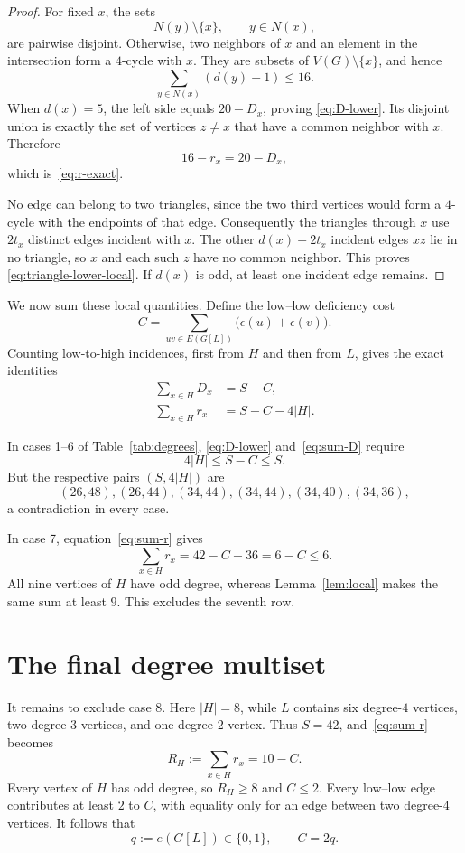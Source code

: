 \documentclass[11pt]{article}
\begin{document}
\begin{proof}
For fixed $x$, the sets
\[
 N(y)\setminus\{x\},\qquad y\in N(x),
\]
are pairwise disjoint.  Otherwise, two neighbors of $x$ and an element in
the intersection form a $4$-cycle with $x$.  They are subsets of
$V(G)\setminus\{x\}$, and hence
\begin{equation}\label{eq:local-packing}
 \sum_{y\in N(x)}(d(y)-1)\leq16.
\end{equation}
When $d(x)=5$, the left side equals $20-D_x$, proving
\eqref{eq:D-lower}.  Its disjoint union is exactly the set of vertices
$z\ne x$ that have a common neighbor with $x$.  Therefore
\[
 16-r_x=20-D_x,
\]
which is~\eqref{eq:r-exact}.

No edge can belong to two triangles, since the two third vertices would
form a $4$-cycle with the endpoints of that edge.  Consequently the
triangles through $x$ use $2t_x$ distinct edges incident with $x$.  The
other $d(x)-2t_x$ incident edges $xz$ lie in no triangle, so $x$ and each
such $z$ have no common neighbor.  This proves
\eqref{eq:triangle-lower-local}.  If $d(x)$ is odd, at least one incident
edge remains.
\end{proof}

We now sum these local quantities.  Define the low--low deficiency cost
\[
 C=\sum_{uv\in E(G[L])}\bigl(\epsilon(u)+\epsilon(v)\bigr).
\]
Counting low-to-high incidences, first from $H$ and then from $L$, gives the
exact identities
\begin{align}
 \sum_{x\in H}D_x&=S-C,\label{eq:sum-D}\\
 \sum_{x\in H}r_x&=S-C-4|H|.\label{eq:sum-r}
\end{align}

In cases 1--6 of Table~\ref{tab:degrees},
\eqref{eq:D-lower} and~\eqref{eq:sum-D} require
\[
 4|H|\leq S-C\leq S.
\]
But the respective pairs $(S,4|H|)$ are
\[
 (26,48),(26,44),(34,44),(34,44),(34,40),(34,36),
\]
a contradiction in every case.

In case 7, equation~\eqref{eq:sum-r} gives
\[
 \sum_{x\in H}r_x=42-C-36=6-C\leq6.
\]
All nine vertices of $H$ have odd degree, whereas
Lemma~\ref{lem:local} makes the same sum at least $9$.  This excludes the
seventh row.

\section{The final degree multiset}

It remains to exclude case 8.  Here $|H|=8$, while $L$ contains six
degree-$4$ vertices, two degree-$3$ vertices, and one degree-$2$ vertex.
Thus $S=42$, and~\eqref{eq:sum-r} becomes
\begin{equation}\label{eq:RH}
 R_H:=\sum_{x\in H}r_x=10-C.
\end{equation}
Every vertex of $H$ has odd degree, so $R_H\geq8$ and $C\leq2$.
Every low--low edge contributes at least $2$ to $C$, with equality only for
an edge between two degree-$4$ vertices.  It follows that
\begin{equation}\label{eq:q}
 q:=e(G[L])\in\{0,1\},\qquad C=2q.
\end{equation}
\end{document}
